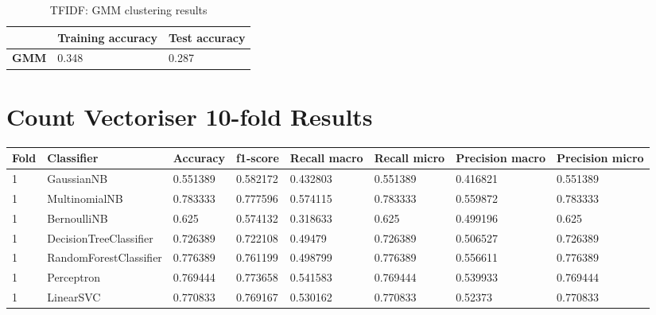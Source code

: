\documentclass{article}
\begin{document}
\begin{table}[h]
\begin{tabular}{l|ll}
             & \textbf{Training accuracy} & \textbf{Test accuracy} \\ \hline
\textbf{GMM} & 0.348                      & 0.287                 
\end{tabular}
\caption{TFIDF: GMM clustering results}
\end{table}

\section{Count Vectoriser 10-fold Results}
\begin{table}[h]
\begin{tabular}{llllllll}
\textbf{Fold} & \textbf{Classifier}    & \textbf{Accuracy} & \textbf{f1-score} & \textbf{Recall macro} & \textbf{Recall micro} & \textbf{Precision macro} & \textbf{Precision micro} \\ \hline
1             & GaussianNB             & 0.551389          & 0.582172          & 0.432803              & 0.551389              & 0.416821                 & 0.551389                 \\
1             & MultinomialNB          & 0.783333          & 0.777596          & 0.574115              & 0.783333              & 0.559872                 & 0.783333                 \\
1             & BernoulliNB            & 0.625             & 0.574132          & 0.318633              & 0.625                 & 0.499196                 & 0.625                    \\
1             & DecisionTreeClassifier & 0.726389          & 0.722108          & 0.49479               & 0.726389              & 0.506527                 & 0.726389                 \\
1             & RandomForestClassifier & 0.776389          & 0.761199          & 0.498799              & 0.776389              & 0.556611                 & 0.776389                 \\
1             & Perceptron             & 0.769444          & 0.773658          & 0.541583              & 0.769444              & 0.539933                 & 0.769444                 \\
1             & LinearSVC              & 0.770833          & 0.769167          & 0.530162              & 0.770833              & 0.52373                  & 0.770833                 \\

\end{tabular}
\end{table}
\end{document}
